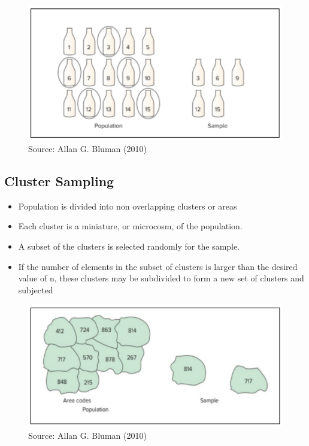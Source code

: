 \documentclass[
  a4paper,
  DIV=11,
  numbers=noendperiod,
  oneside]{scrreprt}
\providecommand{\tightlist}{%
  \setlength{\itemsep}{0pt}\setlength{\parskip}{0pt}}\usepackage{longtable,booktabs,array}
\begin{document}
\begin{figure}

{\centering \includegraphics[width=5.20833in,height=\textheight]{images/ch1/Picture15.png}

}

\caption{Source: Allan G. Bluman (2010)}

\end{figure}

\hypertarget{cluster-sampling}{%
\subsection{Cluster Sampling}\label{cluster-sampling}}

\begin{itemize}
\tightlist
\item
  Population is divided into non overlapping clusters or areas
\item
  Each cluster is a miniature, or microcosm, of the population.
\item
  A subset of the clusters is selected randomly for the sample.
\item
  If the number of elements in the subset of clusters is larger than the
  desired value of n, these clusters may be subdivided to form a new set
  of clusters and subjected
\end{itemize}

\begin{figure}

{\centering \includegraphics[width=5.20833in,height=\textheight]{images/ch1/Picture16.png}

}

\caption{Source: Allan G. Bluman (2010)}

\end{figure}
\end{document}
